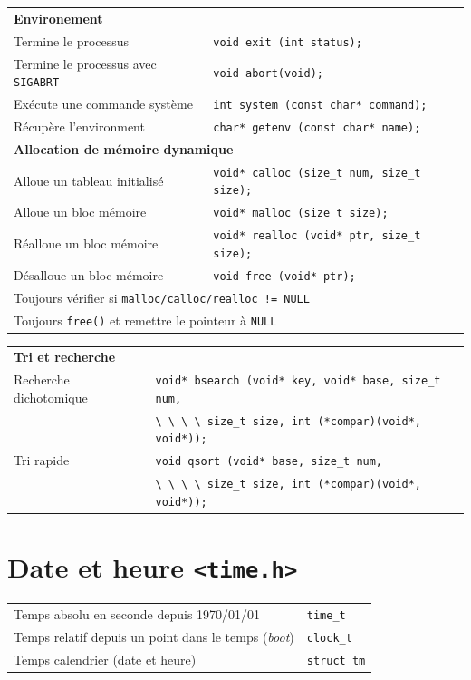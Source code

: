\documentclass{article}
\newcommand{\cd}{\lstinline}
\begin{document}
\begin{multicols*}{3}
\begin{tabularx}{\linewidth}{Xl}
  \multicolumn{2}{l}{\bf Environement} \rule{0pt}{3ex}\\
  Termine le processus & \cd{void exit (int status);} \\
  Termine le processus avec \cd{SIGABRT} & \cd{void abort(void);} \\
  Exécute une commande système & \cd{int system (const char* command);} \\
  Récupère l'environment & \cd{char* getenv (const char* name);} \\

  \multicolumn{2}{l}{\bf Allocation de mémoire dynamique} \rule{0pt}{3ex} \\
  Alloue un tableau initialisé & \cd{void* calloc (size_t num, size_t size);} \\
  Alloue un bloc mémoire & \cd{void* malloc (size_t size);} \\
  Réalloue un bloc mémoire & \cd{void* realloc (void* ptr, size_t size);} \\
  Désalloue un bloc mémoire & \cd{void free (void* ptr);} \\
  \multicolumn{2}{l}{\footnotesize Toujours vérifier si \cd{malloc/calloc/realloc != NULL}} \\
  \multicolumn{2}{l}{\footnotesize Toujours \cd{free()} et remettre le pointeur à \cd{NULL}} \\
\end{tabularx}
\begin{tabularx}{\linewidth}{Xl}
  \multicolumn{2}{l}{\bf Tri et recherche} \rule{0pt}{3ex} \\
  Recherche dichotomique & \cd{void* bsearch (void* key, void* base, size_t num,} \\
                         & \cd{\ \ \ \ size_t size, int (*compar)(void*, void*));} \\
  Tri rapide             & \cd{void qsort (void* base, size_t num,} \\
                         & \cd{\ \ \ \ size_t size, int (*compar)(void*, void*));} \\
\end{tabularx}

\section*{Date et heure \texttt{<time.h>}}
\begin{tabularx}{\linewidth}{Xl}
  Temps absolu en seconde depuis 1970/01/01 & \cd{time_t} \\
  Temps relatif depuis un point dans le temps (\emph{boot}) & \cd{clock_t} \\
  Temps calendrier (date et heure) & \cd{struct tm} \\
\end{tabularx}


\end{multicols*}
\end{document}
